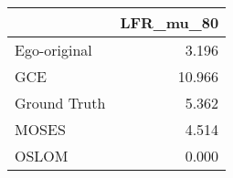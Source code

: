 \begin{tabular}{lr}
\toprule
{} & LFR_mu_80 \\
\midrule
Ego-original &     3.196 \\
GCE          &    10.966 \\
Ground Truth &     5.362 \\
MOSES        &     4.514 \\
OSLOM        &     0.000 \\
\bottomrule
\end{tabular}
